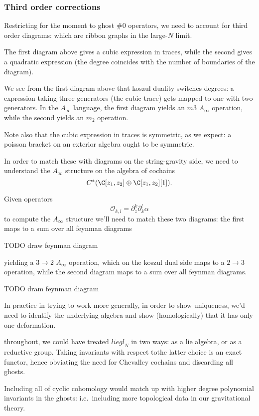 \documentclass[12pt]{amsart}
\begin{document}
\subsubsection{Third order corrections}
Restricting for the moment to ghost \#$0$ operators, we need to account for third order diagrams:
which are ribbon graphs in the large-$N$ limit.

The first diagram above gives a cubic expression in traces, while the second
gives a quadratic expression (the degree coincides with the number of
boundaries of the diagram).\par
\begin{rmk}
  We see from the first diagram above that koszul duality switches degrees: a
  expression taking three generators (the cubic trace) gets mapped to one with
  two generators. In the $A_{\infty}$ language, the first diagram yields an
  $m3$ $A_{\infty}$ operation, while the second yields an $m_2$ operation.\par

  Note also that the cubic expression in traces is symmetric,
  as we expect: a poisson bracket on an exterior algebra ought to be symmetric.
\end{rmk}

In order to match these with diagrams on the string-gravity side, we need to
understand the $A_{\infty}$ structure on the algebra of cochains
$$C^*(\C[z_1,z_2]\oplus\C[z_1,z_2][1]).$$

Given operators $$\mathcal{O}_{k,l} = \partial_z^k\partial_k^l\alpha$$ to
compute the $A_{\infty}$ structure we'll need to match these two diagrams: the
first maps to a sum over all feynman diagrams

TODO draw feynman diagram

yielding a $3 \rightarrow 2$ $A_{\infty}$ operation, which on the koszul dual
side maps to a $2 \rightarrow 3$ operation, while the second diagram maps to a
sum over all feynman diagrams.

TODO dram feynman diagram

\begin{rmk}
  In practice in trying to work more generally, in order to show uniqueness,
  we'd need to identify the underlying algebra and show (homologically) that it
  has only one deformation.
\end{rmk}

\begin{rmk}
  throughout, we could have treated $lie{gl}_N$ in two ways: as a lie algebra,
  or as a reductive group. Taking invariants with respect tothe latter choice
  is an exact functor, hence obviating the need for Chevalley cochains and
  discarding all ghosts.\par

  Including all of cyclic cohomology would match up with
  higher degree polynomial invariants in the ghosts: i.e.\ including more
  topological data in our gravitational theory.
\end{rmk}
\end{document}
